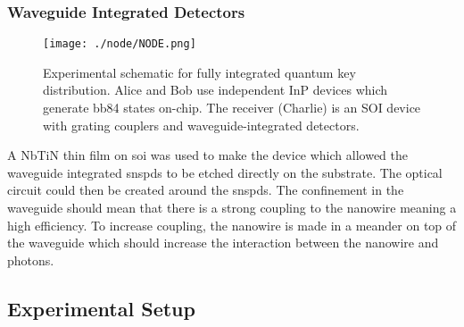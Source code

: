 \subsubsection*{Waveguide Integrated Detectors}

\begin{figure}[t]
	\centering
	\texttt{[image: ./node/NODE.png]}
	\caption[Schematic of a fully optically integrated QKD system]{Experimental schematic for fully integrated quantum key distribution. Alice and Bob use independent \acs{InP} devices which generate \acs{bb84} states on-chip. The receiver (Charlie) is an SOI device with grating couplers and waveguide-integrated detectors.}
	\label{fig:node}
\end{figure}

A \ac{NbTiN} thin film on \ac{soi} was used to make the device which allowed the waveguide integrated \acp{snspd} to be etched directly on the substrate. The optical circuit could then be created around the \acp{snspd}. The confinement in the waveguide should mean that there is a strong coupling to the nanowire meaning a high efficiency. To increase coupling, the nanowire is made in a meander on top of the waveguide which should increase the interaction between the nanowire and photons.




%

\subsection{Experimental Setup}

